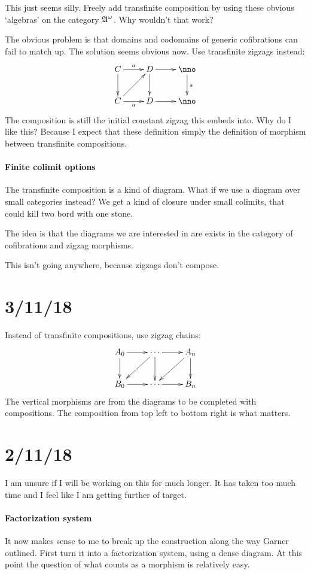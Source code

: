 \documentclass[csh.tex]{subfiles}
\begin{document}
This just seems silly. Freely add transfinite composition by using these obvious `algebras' on the category $\mathfrak A^\omega$. Why wouldn't that work?

The obvious problem is that domains and codomains of generic cofibrations can fail to match up. The solution seems obvious now. Use transfinite zigzags instead:
\[\xymatrix{
C \ar[r]^a \ar[d] & D \ar[r]\ar[d] & \nno\ar[d]^s\\
C \ar[r]_a \ar[ur] & D \ar[r] & \nno
}\]
The composition is still the initial constant zigzag this embeds into.
Why do I like this? Because I expect that these definition simply the definition of morphism between transfinite compositions.

\paragraph{Finite colimit options}
The transfinite composition is a kind of diagram. What if we use a diagram over small categories instead?
We get a kind of closure under small colimits, that could kill two bord with one stone.

The idea is that the diagrams we are interested in are exists in the category of cofibrations and zigzag morphisms. 

This isn't going anywhere, because zigzags don't compose.



\section{3/11/18}
Instead of transfinite compositions, use zigzag chains:
\[\xymatrix{
A_0 \ar[r]\ar[d] & \cdots \ar[r]\ar[d]\ar[dl] & A_n \ar[d]\ar[dl] \\
B_0 \ar[r]& \cdots \ar[r]& B_n
}\]
The vertical morphisms are from the diagrams to be completed with compositions. The composition from top left to bottom right is what matters.

\section{2/11/18}
I am unsure if I will be working on this for much longer. It has taken too much time and I feel like I am getting further of target. 

\paragraph{Factorization system}
It now makes sense to me to break up the construction along the way Garner outlined. First turn it into a factorization system, using a dense diagram. At this point the question of what counts as a morphism is relatively easy.
\end{document}
